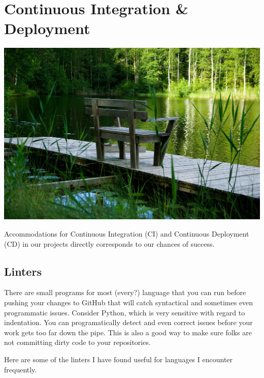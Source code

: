 \chapter{Continuous Integration \& Deployment}

\includegraphics[scale=0.20]{../images/finland-905712_1920.jpg}

\justify
Accommodations for Continuous Integration (CI) and Continuous Deployment
(CD) in our projects directly corresponds to our chances of success.

\section{Linters}

\justify
There are small programs for most (every?) language that you can run before
pushing your changes to GitHub that will catch syntactical and sometimes
even programmatic issues. Consider Python, which is very sensitive with
regard to indentation. You can programatically detect and even correct issues
before your work gets too far down the pipe. This is also a good way to
make sure folks are not committing dirty code to your repositories.

\justify
Here are some of the linters I have found useful for languages I encounter
frequently.

